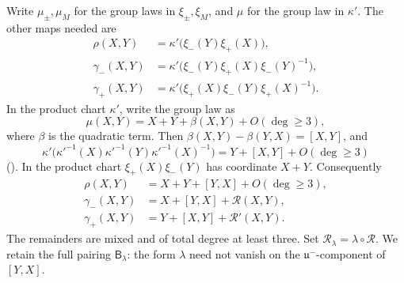 \documentclass[11pt,reqno]{amsart}
\numberwithin{equation}{section}
\theoremstyle{plain}
\theoremstyle{definition}
\theoremstyle{remark}
\theoremstyle{plain}
\newcommand{\uu}{\mathfrak{u}}   %
\newcommand{\lf}{\lambda}
\newcommand{\Bf}{\mathsf{B}}
\begin{document}
Write $\mu_\pm,\mu_M$ for the group laws in $\xi_\pm,\xi_M$, and
$\mu$ for the group law in $\kappa'$. The other maps needed are
\[
\begin{aligned}
\rho(X,Y)&=\kappa'\bigl(\xi_-(Y)\xi_+(X)\bigr),\\
\gamma_-(X,Y)&=\kappa'\bigl(\xi_-(Y)\xi_+(X)\xi_-(Y)^{-1}\bigr),\\
\gamma_+(X,Y)&=\kappa'\bigl(\xi_+(X)\xi_-(Y)\xi_+(X)^{-1}\bigr).
\end{aligned}
\]
In the product chart $\kappa'$, write the group law as
\[
\mu(X,Y)=X+Y+\beta(X,Y)+O(\deg\ge3),
\]
where $\beta$ is the quadratic term.
Then $\beta(X,Y)-\beta(Y,X)=[X,Y]$, and
\begin{equation}\label{eq:serre}
\kappa'\bigl(\kappa'^{-1}(X)\kappa'^{-1}(Y)
\kappa'^{-1}(X)^{-1}\bigr)
=Y+[X,Y]+O(\deg\ge3)
\end{equation}
(\cite[Part~II, Chapter~IV, \S7, and Chapter~V, \S1]{MR2179691}).
In the product chart $\xi_+(X)\xi_-(Y)$ has coordinate $X+Y$.
Consequently
\begin{equation}\label{eq:quadratic}
\begin{aligned}
\rho(X,Y)&=X+Y+[Y,X]+O(\deg\ge3),\\
\gamma_-(X,Y)&=X+[Y,X]+\mathscr R(X,Y),\\
\gamma_+(X,Y)&=Y+[X,Y]+\mathscr R'(X,Y).
\end{aligned}
\end{equation}
The remainders are mixed and of total degree at least three.
Set $\mathscr R_\lf=\lf\circ\mathscr R$. We retain the full pairing
$\Bf_\lf$: the form $\lf$ need not vanish on the
$\uu^-$-component of $[Y,X]$.
\end{document}
